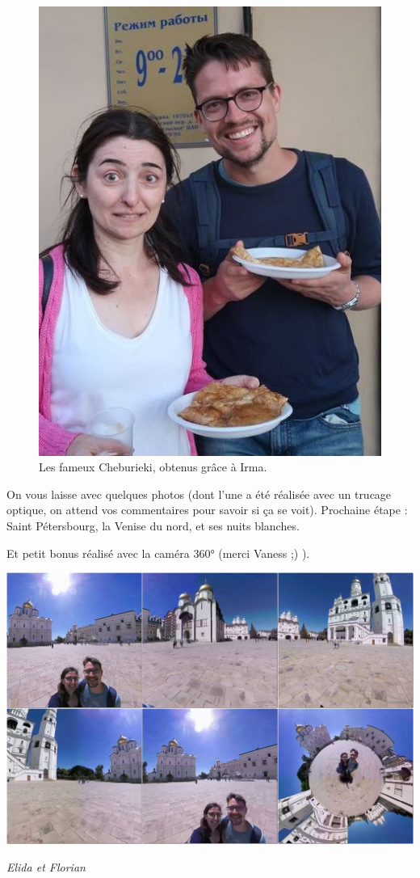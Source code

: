\begin{figure}
\centering
\includegraphics{images/20180603_cheburieki.JPG}
\caption{Les fameux Cheburieki, obtenus grâce à Irma.}
\end{figure}

On vous laisse avec quelques photos (dont l'une a été réalisée avec un
trucage optique, on attend vos commentaires pour savoir si ça se voit).
Prochaine étape : Saint Pétersbourg, la Venise du nord, et ses nuits
blanches.

Et petit bonus réalisé avec la caméra 360° (merci Vaness ;) ).

\includegraphics{montage/russie.jpg}

\emph{Elida et Florian}


